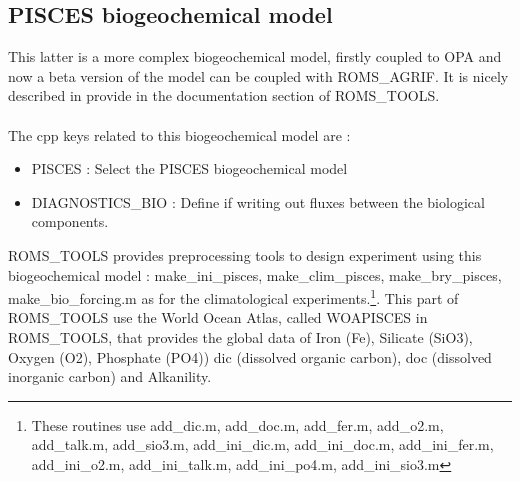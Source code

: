 \subsection{PISCES biogeochemical model}
This latter is a more complex biogeochemical model, firstly coupled to OPA and now a
beta version of the model can be coupled with ROMS\_AGRIF. It is nicely
described in \citep{AumontNoticePisces05} provide in the documentation section of
ROMS\_TOOLS.\\ \\
The cpp keys related to this biogeochemical model are :
\begin{itemize}
\item PISCES : Select the PISCES biogeochemical model
\item DIAGNOSTICS\_BIO : Define if writing out fluxes between the biological
components. \\
\end{itemize}
ROMS\_TOOLS provides preprocessing tools to design experiment using this
biogeochemical model : make\_ini\_pisces, make\_clim\_pisces, make\_bry\_pisces,
make\_bio\_forcing.m as for the climatological experiments.\footnote{These routines
  use add\_dic.m, add\_doc.m, add\_fer.m, add\_o2.m, add\_talk.m, add\_sio3.m,
  add\_ini\_dic.m, add\_ini\_doc.m, add\_ini\_fer.m, add\_ini\_o2.m,
  add\_ini\_talk.m, add\_ini\_po4.m, add\_ini\_sio3.m}. This part of ROMS\_TOOLS use
the World Ocean Atlas, called WOAPISCES in ROMS\_TOOLS, that provides the global data
of Iron (Fe), Silicate (SiO3), Oxygen (O2), Phosphate (PO4)) dic (dissolved organic
carbon), doc (dissolved inorganic carbon) and Alkanility. \\

